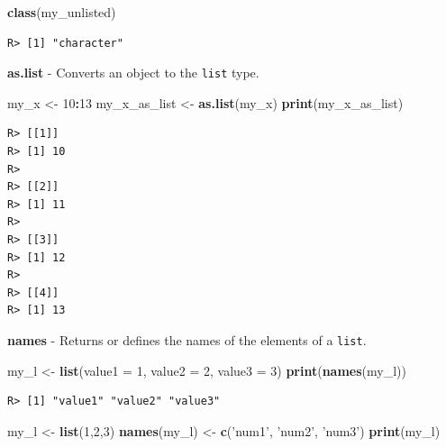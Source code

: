 \documentclass[
  12pt,
]{book}
\newenvironment{Shaded}{\begin{snugshade}}{\end{snugshade}}
\newcommand{\DataTypeTok}[1]{\textcolor[rgb]{0.27,0.27,0.27}{#1}}
\newcommand{\DecValTok}[1]{\textcolor[rgb]{0.06,0.06,0.06}{#1}}
\newcommand{\KeywordTok}[1]{\textcolor[rgb]{0.27,0.27,0.27}{\textbf{#1}}}
\newcommand{\NormalTok}[1]{#1}
\newcommand{\OperatorTok}[1]{\textcolor[rgb]{0.43,0.43,0.43}{\textbf{#1}}}
\newcommand{\StringTok}[1]{\textcolor[rgb]{0.5,0.5,0.5}{#1}}
\begin{document}
\begin{Shaded}
\begin{Highlighting}[]
\KeywordTok{class}\NormalTok{(my_unlisted)}
\end{Highlighting}
\end{Shaded}

\begin{verbatim}
R> [1] "character"
\end{verbatim}

\textbf{as.list} - Converts an object to the \texttt{list} type. 

\begin{Shaded}
\begin{Highlighting}[]
\NormalTok{my_x <-}\StringTok{ }\DecValTok{10}\OperatorTok{:}\DecValTok{13}
\NormalTok{my_x_as_list <-}\StringTok{ }\KeywordTok{as.list}\NormalTok{(my_x)}
\KeywordTok{print}\NormalTok{(my_x_as_list)}
\end{Highlighting}
\end{Shaded}

\begin{verbatim}
R> [[1]]
R> [1] 10
R> 
R> [[2]]
R> [1] 11
R> 
R> [[3]]
R> [1] 12
R> 
R> [[4]]
R> [1] 13
\end{verbatim}

\textbf{names} - Returns or defines the names of the elements of a \texttt{list}. 

\begin{Shaded}
\begin{Highlighting}[]
\NormalTok{my_l <-}\StringTok{ }\KeywordTok{list}\NormalTok{(}\DataTypeTok{value1 =} \DecValTok{1}\NormalTok{, }\DataTypeTok{value2 =} \DecValTok{2}\NormalTok{, }\DataTypeTok{value3 =} \DecValTok{3}\NormalTok{)}
\KeywordTok{print}\NormalTok{(}\KeywordTok{names}\NormalTok{(my_l))}
\end{Highlighting}
\end{Shaded}

\begin{verbatim}
R> [1] "value1" "value2" "value3"
\end{verbatim}

\begin{Shaded}
\begin{Highlighting}[]
\NormalTok{my_l <-}\StringTok{ }\KeywordTok{list}\NormalTok{(}\DecValTok{1}\NormalTok{,}\DecValTok{2}\NormalTok{,}\DecValTok{3}\NormalTok{)}
\KeywordTok{names}\NormalTok{(my_l) <-}\StringTok{ }\KeywordTok{c}\NormalTok{(}\StringTok{'num1'}\NormalTok{, }\StringTok{'num2'}\NormalTok{, }\StringTok{'num3'}\NormalTok{)}
\KeywordTok{print}\NormalTok{(my_l)}
\end{Highlighting}
\end{Shaded}
\end{document}
